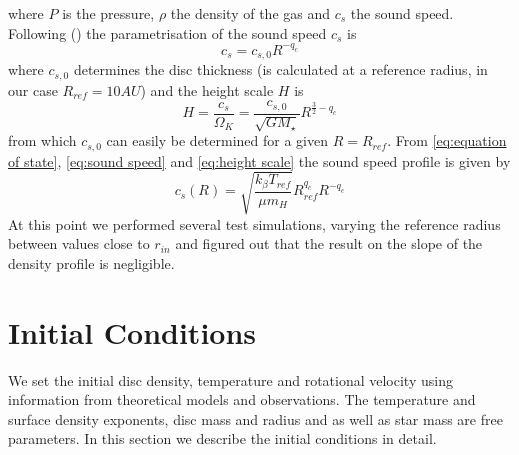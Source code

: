 \documentclass[aps,prb,twocolumn,superscriptaddress,floatfix,longbibliography]{revtex4-2}
\newcounter{para}
\begin{document}
where $P$ is the pressure, $\rho$ the density of the gas and $c_s$ the sound speed. 
Following (\cite{lodato2007warp}) the parametrisation of the sound speed $c_s$ is
\begin{equation}\label{eq:sound speed}
    c_s = c_{s,0}R^{-q_c}
\end{equation}
where $c_{s,0}$ determines the disc thickness (is calculated at a reference radius, in our case $R_{ref} = 10 AU$) and the height scale $H$ is
\begin{equation}\label{eq:height scale}
    H = \frac{c_s}{\Omega_K} = \frac{c_{s,0}}{\sqrt{GM_\star}} R^{\frac{3}{2}-q_c}
\end{equation}
from which $c_{s,0}$ can easily be determined for a given $R=R_{ref}$. 
From \eqref{eq:equation of state}, \eqref{eq:sound speed} and \eqref{eq:height scale} the sound speed profile is given by
\begin{equation}
    c_s(R) = \sqrt{\frac{k_{\beta}T_{ref}}{\mu m_H}} R_{ref}^{q_c} R^{-q_c}
\end{equation}
At this point we performed several test simulations, varying the reference radius between values close to $r_{in}$ and figured out that the result on the slope of the density profile is negligible.
\section{Initial Conditions}
 We set the initial disc density, temperature and rotational velocity using information from theoretical models and observations. The temperature and surface density exponents, disc mass and radius and as well as star mass are free parameters. In this section we describe the initial conditions in detail.
\end{document}
